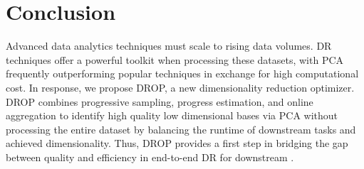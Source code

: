 
\begin{comment}
\begin{figure}
\texttt{[image: figs/beyond\_tss\_lesion.pdf]}
\caption[]{End-to-End runtime lesion study of the entire MNIST dataset and the FMA featurized music dataset. Each of DROP's contributions provides a runtime improvement.}
\label{fig:beyond_lesion}
\end{figure}
\end{comment}



\section{Conclusion}
\label{sec:conclusion}

Advanced data analytics techniques must scale to rising data volumes. 
DR techniques offer a powerful toolkit when processing these datasets, with PCA frequently outperforming popular techniques in exchange for high computational cost. 
In response, we propose DROP, a new dimensionality reduction optimizer. 
DROP combines progressive sampling, progress estimation, and online aggregation to identify high quality low dimensional bases via PCA without processing the entire dataset by balancing the runtime of downstream tasks and achieved dimensionality. 
Thus, DROP provides a first step in bridging the gap between quality and efficiency in end-to-end DR for downstream . 



